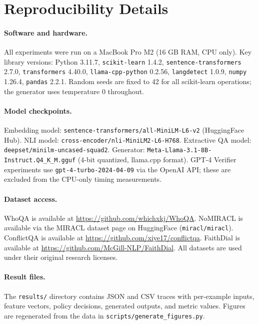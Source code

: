 \section{Reproducibility Details}
\label{app:reproducibility}

\paragraph{Software and hardware.}
All experiments were run on a MacBook Pro M2 (16 GB RAM, CPU only). Key library versions: Python 3.11.7, \texttt{scikit-learn} 1.4.2, \texttt{sentence-transformers} 2.7.0, \texttt{transformers} 4.40.0, \texttt{llama-cpp-python} 0.2.56, \texttt{langdetect} 1.0.9, \texttt{numpy} 1.26.4, \texttt{pandas} 2.2.1. Random seeds are fixed to 42 for all scikit-learn operations; the generator uses temperature 0 throughout.

\paragraph{Model checkpoints.}
Embedding model: \texttt{sentence-transformers/all-MiniLM-L6-v2} (HuggingFace Hub). NLI model: \texttt{cross-encoder/nli-MiniLM2-L6-H768}. Extractive QA model: \texttt{deepset/minilm-uncased-squad2}. Generator: \texttt{Meta-Llama-3.1-8B-Instruct.Q4\_K\_M.gguf} (4-bit quantized, llama.cpp format). GPT-4 Verifier experiments use \texttt{gpt-4-turbo-2024-04-09} via the OpenAI API; these are excluded from the CPU-only timing measurements.

\paragraph{Dataset access.}
WhoQA is available at \url{https://github.com/whichxkj/WhoQA}. NoMIRACL is available via the MIRACL dataset page on HuggingFace (\texttt{miracl/miracl}). ConflictQA is available at \url{https://github.com/xiye17/conflictqa}. FaithDial is available at \url{https://github.com/McGill-NLP/FaithDial}. All datasets are used under their original research licenses.

\paragraph{Result files.}
The \texttt{results/} directory contains JSON and CSV traces with per-example inputs, feature vectors, policy decisions, generated outputs, and metric values. Figures are regenerated from the data in \texttt{scripts/generate\_figures.py}.
